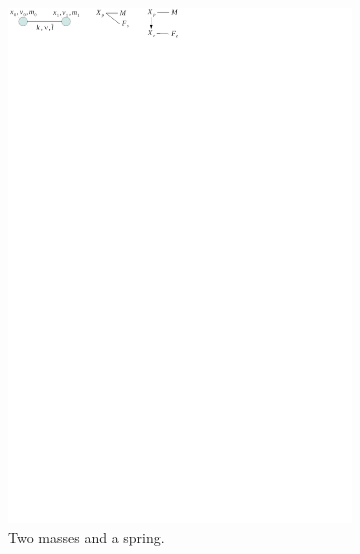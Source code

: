\begin{figure}
 \centering
 \begin{subfigure}[t]{0.36\linewidth} \centering
   \includegraphics[clip,trim=0mm 285mm 155mm 0mm]{mass-spring.pdf}
   \caption{Two masses and a spring.} \label{fig mass-spring}
 \end{subfigure}
 \begin{subfigure}[t]{0.3\linewidth} \centering

\end{subfigure}
\end{figure}
